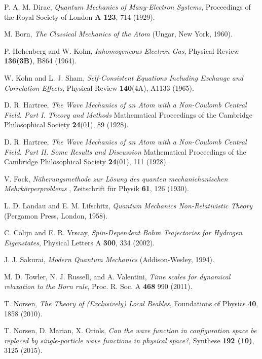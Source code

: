 \documentclass[nofootinbib, secnumarabic, amsmath, nobibnotes,11pt,aps,pra, floatfix]{revtex4-1}
\begin{document}
\begin{thebibliography}{999}
P. A. M. Dirac, \emph{Quantum Mechanics of Many-Electron Systems}, Proceedings of the Royal Society of London \textbf{A 123},  714 (1929).

M. Born, \emph{The Classical Mechanics of the Atom} (Ungar, New York, 1960).

P. Hohenberg and W. Kohn, \emph{Inhomogeneous Electron Gas}, Physical Review {\bf 136(3B)},  B864 (1964).

W. Kohn and L. J. Sham, \emph{Self-Consistent Equations Including Exchange and Correlation Effects}, Physical Review \textbf{140}(4A),  A1133  (1965).

D. R. Hartree, \emph{The Wave Mechanics of an Atom with a Non-Coulomb Central Field. Part I. Theory and Methods} Mathematical Proceedings of the Cambridge Philosophical Society  \textbf{24}(01),  89 (1928).

D. R. Hartree, \emph{The Wave Mechanics of an Atom with a Non-Coulomb Central Field. Part II. Some Results and Discussion} Mathematical Proceedings of the Cambridge Philosophical Society \textbf{24}(01),  111 (1928).

V. Fock, \emph{N\"{a}herungsmethode zur L\"{o}sung des quanten mechanichanischen Mehrk\"{o}rperproblems
}, Zeitschrift f\"{u}r Physik \textbf{61},  126 (1930).

L. D. Landau and E. M. Lifschitz, \emph{Quantum Mechanics Non-Relativistic Theory} (Pergamon Press, London, 1958).

C. Colijn and E. R. Vrscay, \emph{Spin-Dependent Bohm Trajectories for Hydrogen Eigenstates}, Physical Letters A \textbf{300}, 334 (2002).

J. J. Sakurai, \emph{Modern Quantum Mechanics} (Addison-Wesley, 1994).

 M. D. Towler, N. J. Russell, and A. Valentini, \emph{Time scales for dynamical relaxation to the Born rule}, Proc. R. Soc. A \textbf{468}  990 (2011).

T. Norsen, \textit{The Theory of (Exclusively) Local Beables}, Foundations of Physics \textbf{40}, 1858 (2010).

 T. Norsen, D. Marian, X. Oriols, \emph{Can the wave function in configuration space be replaced by single-particle wave functions in physical space?}, Synthese \textbf{192 (10)},  3125 (2015).


\end{thebibliography}
\end{document}
